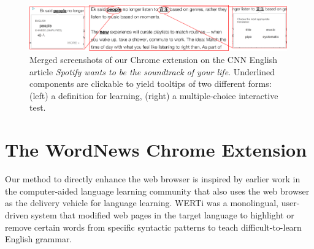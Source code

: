 

\begin{figure}[ht]
\centering
\includegraphics[width=0.99\textwidth]{chrome_extension_new_3.png}
\caption{Merged screenshots of our Chrome extension on the CNN English
  article 
  {\it  Spotify wants to be the soundtrack of your life}.
    Underlined components are clickable to yield
  tooltips of two different forms: (left) a definition for learning, (right)
  a multiple-choice interactive test.}
\label{fig:chrome_extension_1}
\end{figure}

\section{The WordNews Chrome Extension}

Our method to directly enhance the web browser is inspired by earlier
work in the computer-aided language learning community that also uses
the web browser as the delivery vehicle for language learning.  WERTi
\cite{metcalf06:_gener_web_based_englis_prepos,meurers2010} was a
monolingual, user-driven system that modified web pages in the target
language to highlight or remove certain words from specific syntactic
patterns to teach difficult-to-learn English grammar.

